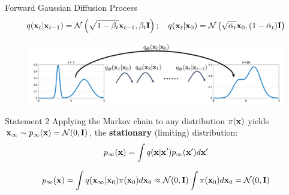 \documentclass{beamer}
\begin{document}
\begin{frame}{Forward Gaussian Diffusion Process}
	\vspace{-0.3cm}
	{\small
	\[
		q(\mathbf{x}_t | \mathbf{x}_{t-1}) = \mathcal{N}\left(\sqrt{1 - \beta_t} \mathbf{x}_{t-1}, \beta_t \mathbf{I}\right); \quad q(\mathbf{x}_t | \mathbf{x}_0) = \mathcal{N}\left(\sqrt{\bar{\alpha}_t} \mathbf{x}_0, (1 - \bar{\alpha}_t) \mathbf{I}\right)
	\]
	}
	\vspace{-0.8cm}
	\begin{figure}
		\includegraphics[width=0.8\linewidth]{figs/conditional_diffusion}
	\end{figure}
    \eqpause
	\vspace{-0.5cm}
	\begin{block}{Statement 2}
		Applying the Markov chain to any distribution $\pi(\mathbf{x})$ yields $\mathbf{x}_\infty \sim p_\infty(\mathbf{x}) = \mathcal{N}(0, \mathbf{I})$, the \textbf{stationary} (limiting) distribution:
		\[
			p_\infty(\mathbf{x}) = \int q(\mathbf{x} | \mathbf{x}') p_\infty(\mathbf{x}') d\mathbf{x}' 
		\]

		\vspace{-0.5cm}
        \eqpause
		\[
			p_\infty(\mathbf{x}) = \int q(\mathbf{x}_\infty | \mathbf{x}_0) \pi(\mathbf{x}_0) d\mathbf{x}_0 \approx \mathcal{N}(0, \mathbf{I}) \int \pi(\mathbf{x}_0) d\mathbf{x}_0 = \mathcal{N}(0, \mathbf{I})
		\]
	\end{block}
 \end{frame}
\end{document}
